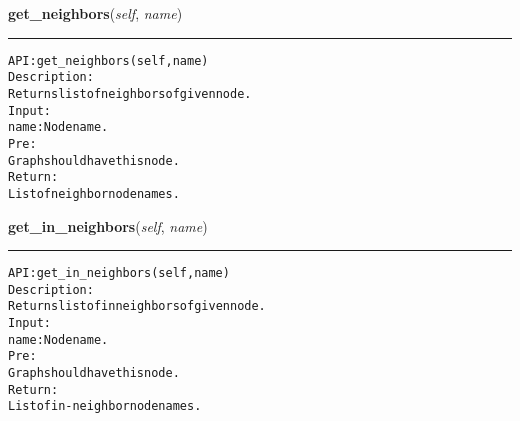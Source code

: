     \label{coinor:gimpy:graph:Graph:get_neighbors}

    \vspace{0.5ex}

\hspace{.8\funcindent}\begin{boxedminipage}{\funcwidth}

    \raggedright \textbf{get\_neighbors}(\textit{self}, \textit{name})

    \vspace{-1.5ex}

    \rule{\textwidth}{0.5\fboxrule}
\setlength{\parskip}{2ex}
\begin{alltt}

API: get\_neighbors(self, name)
Description:
Returns list of neighbors of given node.
Input:
    name: Node name.
Pre:
    Graph should have this node.
Return:
    List of neighbor node names.
\end{alltt}

\setlength{\parskip}{1ex}
    \end{boxedminipage}

    \label{coinor:gimpy:graph:Graph:get_in_neighbors}

    \vspace{0.5ex}

\hspace{.8\funcindent}\begin{boxedminipage}{\funcwidth}

    \raggedright \textbf{get\_in\_neighbors}(\textit{self}, \textit{name})

    \vspace{-1.5ex}

    \rule{\textwidth}{0.5\fboxrule}
\setlength{\parskip}{2ex}
\begin{alltt}

API: get\_in\_neighbors(self, name)
Description:
Returns list of in neighbors of given node.
Input:
    name: Node name.
Pre:
    Graph should have this node.
Return:
    List of in-neighbor node names.
\end{alltt}

\setlength{\parskip}{1ex}
    \end{boxedminipage}


